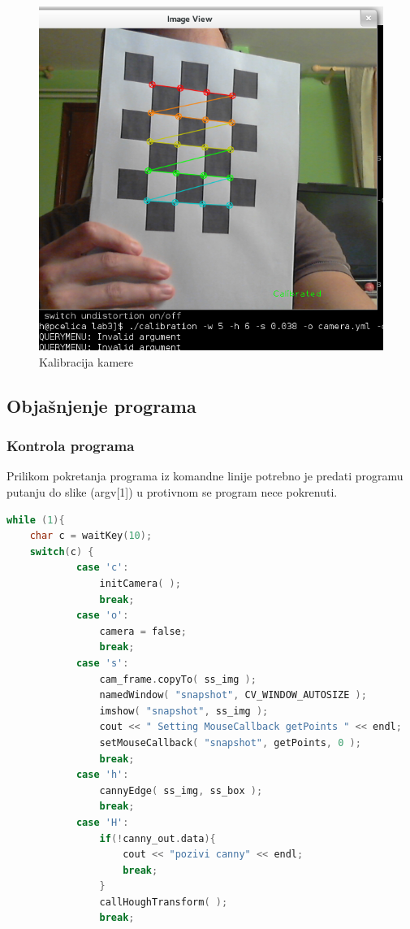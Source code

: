 \begin{figure}[h]
\centering
\includegraphics[scale=0.4]{images/lab3-01-calib.png}
\caption{Kalibracija kamere}
\label{fig:lab3-01-calib}
\end{figure}

\newpage
\subsection{Objašnjenje programa}

\subsubsection{Kontrola programa}

Prilikom pokretanja programa iz komandne linije potrebno je 
predati programu putanju do slike (argv[1]) u protivnom se program 
nece pokrenuti. \\
\begin{lstlisting}[language=C,caption={Kontrola programa tipkovnicom}]
while (1){
    char c = waitKey(10);
    switch(c) {
            case 'c':
                initCamera( );
                break;
            case 'o':
                camera = false;
                break;
            case 's':
                cam_frame.copyTo( ss_img );
                namedWindow( "snapshot", CV_WINDOW_AUTOSIZE );
                imshow( "snapshot", ss_img );
                cout << " Setting MouseCallback getPoints " << endl;
                setMouseCallback( "snapshot", getPoints, 0 );
                break;
            case 'h':
                cannyEdge( ss_img, ss_box );
                break;
            case 'H':
                if(!canny_out.data){
                    cout << "pozivi canny" << endl;
                    break;
                }
                callHoughTransform( );
                break;
\end{lstlisting}

